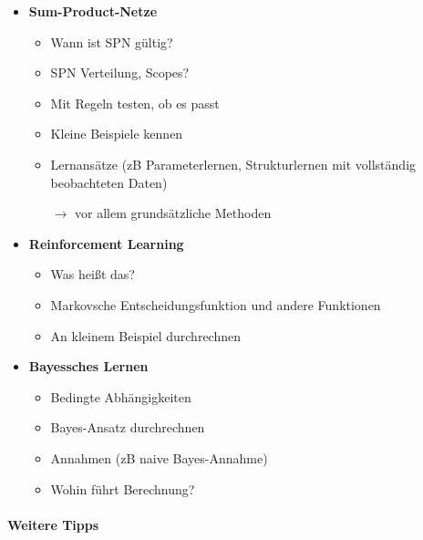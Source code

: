 \documentclass[fleqn]{latex-classes/summary}
\begin{document}
\begin{itemize}
\begin{itemize}
  \end{itemize}
  \item \textbf{Sum-Product-Netze}
  \begin{itemize}
    \item Wann ist SPN gültig?
    \item SPN Verteilung, Scopes?
    \item Mit Regeln testen, ob es passt
    \item Kleine Beispiele kennen
    \item Lernansätze (zB Parameterlernen, Strukturlernen mit vollständig beobachteten Daten)
    \item[\( \to \)] vor allem grundsätzliche Methoden
  \end{itemize}
  \item \textbf{Reinforcement Learning}
  \begin{itemize}
    \item Was heißt das?
    \item Markovsche Entscheidungsfunktion und andere Funktionen
    \item An kleinem Beispiel durchrechnen
  \end{itemize}
  \item \textbf{Bayessches Lernen}
  \begin{itemize}
    \item Bedingte Abhängigkeiten
    \item Bayes-Ansatz durchrechnen
    \item Annahmen (zB naive Bayes-Annahme)
    \item Wohin führt Berechnung?
  \end{itemize}
\end{itemize}

\paragraph{Weitere Tipps}
\end{document}
